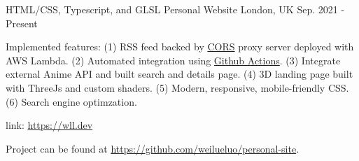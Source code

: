 

\begin{cventries}


  \cventry
    {HTML/CSS, Typescript, and GLSL} %
    {Personal Website} %
    {London, UK} %
    {Sep. 2021 - Present} %
    {
      \begin{cvitems} %
        \item {Implemented features: (1) RSS feed backed by \href{https://developer.mozilla.org/en-US/docs/Web/HTTP/CORS}{CORS} proxy server deployed with AWS Lambda. (2) Automated integration using \href{https://github.com/features/actions}{Github Actions}. (3) Integrate external Anime API and built search and details page. (4) 3D landing page built with ThreeJs and custom shaders. (5) Modern, responsive, mobile-friendly CSS. (6) Search engine optimzation.}
        \item {link: \href{https://wll.dev}{https://wll.dev}}
        \item {Project can be found at \href{https://github.com/weilueluo/personal-site}{https://github.com/weilueluo/personal-site}.}
      \end{cvitems}
    }


\end{cventries}
